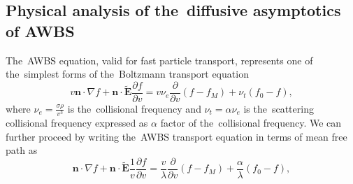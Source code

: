 \documentclass[review]{elsarticle}
\newcommand{\pdv}[2]{\frac{\partial{#1}}{\partial{#2}}}
\newcommand{\vect}[1]{\boldsymbol{#1}}
\newcommand{\mfp}{\lambda}
\newcommand{\nue}{\nu_{e}}
\newcommand{\nutot}{\nu_{t}}
\newcommand{\vmag}{v}
\newcommand{\vn}{\vect{n}}
\newcommand{\tE}{\vect{\tilde{E}}}
\newcommand{\me}{m_e}
\newcommand{\crs}{\sigma}
\newcommand{\fM}{f_M}
\begin{document}
\subsection{Physical analysis of the~diffusive asymptotics of AWBS}\label{sec:diffusive_asymptotics_AWBS}
The~AWBS equation, valid for fast particle transport, represents 
one of the~simplest forms of the~Boltzmann transport equation
\begin{equation}
  \vmag\vn\cdot\nabla f + \vn\cdot\tE\pdv{f}{\vmag}
  = \vmag \nue \pdv{}{\vmag} \left(f - \fM\right) + \nutot \left(f_0 - f\right),
  \label{eq:AWBS}
\end{equation}
where $\nue = \frac{\crs \rho}{\vmag^3}$ is the~collisional frequency and
$\nutot = \alpha \nue$ is the~scattering collisional frequency expressed as
$\alpha$ factor of the~collisional frequency. 
We can further proceed 
by writing the~AWBS transport equation in terms of mean free path as
\begin{equation}
  \vn\cdot\nabla f + \vn\cdot\tE\frac{1}{\vmag}\pdv{f}{\vmag}
  = \frac{\vmag}{\mfp} \pdv{}{\vmag} \left(f - \fM\right) 
  + \frac{\alpha}{\mfp} \left(f_0 - f\right),
  \label{eq:AWBS_mfp}
\end{equation}
\end{document}
